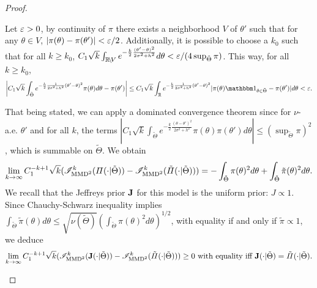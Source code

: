 \begin{proof}
\begin{enumerate}
    Let $\varepsilon>0$, by continuity of $\pi$ there exists a neighborhood $V$ of $\theta'$ such that for any $\theta\in V$,  $|\pi(\theta)-\pi(\theta')|<\varepsilon/2$. %
    Additionally, it is possible to choose a $k_0$ such that for all $k\geq k_0$, $C_1\sqrt{k}\int_{\mathbb{R}\!\setminus\!V} e^{-\frac{k}{2}\frac{(\theta'-\theta)^2}{2\sigma^2+h^2}}d\theta <\varepsilon/(4\sup_{\tilde\Theta}\pi)$. This way, for all $k\geq k_0$,
        \begin{equation}
            \left|C_1\sqrt{k}\int_{\tilde\Theta}e^{-\frac{k}{2}\frac{1}{2\sigma^2+h^2}(\theta'-\theta)^2}\pi(\theta)d\theta -\pi(\theta')  \right| \leq C_1\sqrt{k}\int_{\RR}e^{-\frac{k}{2}\frac{1}{2\sigma^2+h^2}(\theta'-\theta)^2} |\pi(\theta)\indic_{\theta\in\tilde\Theta}-\pi(\theta')|d\theta 
            <\eps.
        \end{equation}
    
    That being stated, we can apply a dominated convergence theorem since for $\nu$-a.e. $\theta'$ and for all $k$, the terms $|C_1\sqrt{k}\int_{\tilde\Theta} e^{-\frac{k}{2}\frac{(\theta-\theta')^2}{2\sigma^2+h^2}}\pi(\theta)\pi(\theta')d\theta |\leq(\sup_{\tilde\Theta}\pi)^2$, which is summable on $\tilde\Theta$.
    We obtain
    \begin{equation}
        \lim_{k\rightarrow\infty} C_1^{-k+1}\sqrt{k}(\mathscr{I}_{\text{MMD}^2}^k(\varPi(\cdot|\tilde\Theta))-\mathscr{I}_{\text{MMD}^2}^k(\tilde\varPi(\cdot|\tilde\Theta)) ) = -\int_{\tilde\Theta}\pi(\theta)^2d\theta + \int_{\tilde\Theta}\tilde\pi(\theta)^2d\theta.
    \end{equation}
    We recall that the Jeffreys prior $\mathbf{J} $ for this model is the uniform prior: $J\propto 1$.
    Since Chauchy-Schwarz inequality implies $\int_{\tilde\Theta}\tilde\pi(\theta)d\theta \leq \sqrt{\nu(\tilde\Theta)} \left(\int_{\tilde\Theta}\pi(\theta)^2d\theta \right)^{1/2}$, with equality if and only if $\tilde\pi\propto 1$, we deduce 
    \begin{equation}
        \lim_{k\rightarrow\infty} C_1^{-k+1}\sqrt{k}(\mathscr{I}_{\text{MMD}^2}^k(\mathbf{J}(\cdot|\tilde\Theta))-\mathscr{I}_{\text{MMD}^2}^k(\tilde\varPi(\cdot|\tilde\Theta)) ) \geq 0 \text{\ with equality iff\ }\mathbf{J}(\cdot|\tilde\Theta) = \tilde\varPi(\cdot|\tilde\Theta).
    \end{equation}


\end{enumerate}
\end{proof}
